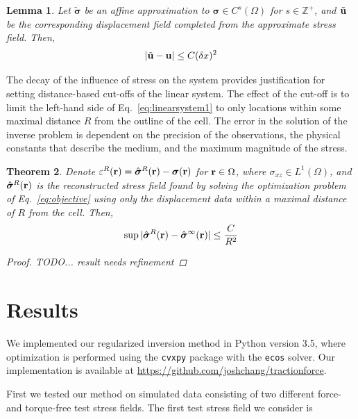 \documentclass[aps,prl,reprint,twocolumn,groupedaddress,showpacs]{revtex4-1}
\newtheorem{thm}{Theorem}%
\newtheorem{lem}[thm]{Lemma}%
\newcommand{\bsigma}{{\boldsymbol\sigma}}
\def\r{{\bf r}}
\def\u{{\bf u}}
\begin{document}
\begin{lem}
\label{lem:affine_error}
Let $\tilde{\bsigma}$ be an affine approximation to $\bsigma\in
C^s(\Omega)$ for $s\in\mathbb{Z}^+$, and $\tilde{\u}$ be the
corresponding displacement field completed from the approximate stress
field. Then,
\begin{equation}
\vert \tilde{\u}  - \u \vert \leq C (\delta x)^2
\end{equation}
\end{lem}

The decay of the influence of stress on the system provides
justification for setting distance-based cut-offs of the linear
system. The effect of the cut-off is to limit the left-hand side of
Eq.~\ref{eq:linearsystem1} to only locations within some maximal
distance $R$ from the outline of the cell.  The error in the solution
of the inverse problem is dependent on the precision of the
observations, the physical constants that describe the medium, and the
maximum magnitude of the stress.

\begin{thm}
\label{thm:main}
Denote $\varepsilon^R(\r) = \hat{\bsigma}^R(\r) - \bsigma(\r)$ for
$\r\in\Omega$, where $\sigma_{xz}\in L^1(\Omega)$, and
$\hat{\bsigma}^R(\r)$ is the reconstructed stress field found by
solving the optimization problem of Eq.~\ref{eq:objective} using only
the displacement data within a maximal distance of $R$ from the
cell. Then,
\begin{equation}
\sup \vert \hat{\bsigma}^R(\r) - \hat{\bsigma}^\infty(\r) \vert \leq \frac{C}{R^2}
\end{equation}

\begin{proof}
TODO... result needs refinement
\end{proof}

\end{thm}


\section{Results}

We implemented our regularized inversion method in Python version 3.5,
where optimization is performed using the \texttt{cvxpy} package with
the \texttt{ecos} solver.  Our implementation is available at
\url{https://github.com/joshchang/tractionforce}. 

First we tested our method on simulated data consisting of two different force- and
torque-free test stress fields. The first test stress field we consider is 
\end{document}
